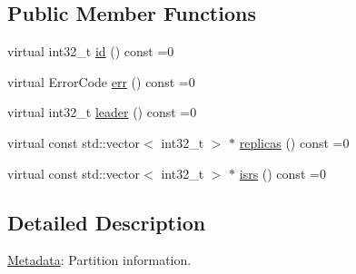 \subsection*{Public Member Functions}
\begin{DoxyCompactItemize}
\item 
virtual int32\_\-t \hyperlink{classRdKafka_1_1PartitionMetadata_a70b1781ddc5ecc3998158ef970b678a0}{id} () const =0
\item 
virtual ErrorCode \hyperlink{classRdKafka_1_1PartitionMetadata_ac7328782aefb58521598ee19ed7857ca}{err} () const =0
\item 
virtual int32\_\-t \hyperlink{classRdKafka_1_1PartitionMetadata_aead184554d4e2c57b670b2e07b5592eb}{leader} () const =0
\item 
virtual const std::vector$<$ int32\_\-t $>$ $\ast$ \hyperlink{classRdKafka_1_1PartitionMetadata_ae7b6c860ea5d487d23616976cbe1a859}{replicas} () const =0
\item 
virtual const std::vector$<$ int32\_\-t $>$ $\ast$ \hyperlink{classRdKafka_1_1PartitionMetadata_acf801e001bec20102cd08119d6d73d88}{isrs} () const =0
\end{DoxyCompactItemize}


\subsection{Detailed Description}
\hyperlink{classRdKafka_1_1Metadata}{Metadata}: Partition information. 

